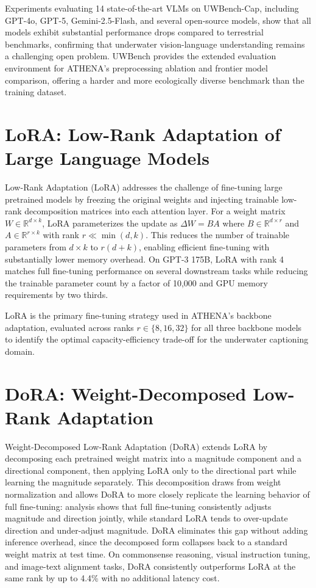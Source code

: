 Experiments evaluating 14 state-of-the-art VLMs on UWBench-Cap, including GPT-4o, GPT-5, Gemini-2.5-Flash, and several open-source models, show that all models exhibit substantial performance drops compared to terrestrial benchmarks, confirming that underwater vision-language understanding remains a challenging open problem. UWBench provides the extended evaluation environment for ATHENA's preprocessing ablation and frontier model comparison, offering a harder and more ecologically diverse benchmark than the training dataset.

\section[Hu, Shen, Wallis, Allen-Zhu, Li, Wang, Wang \& Chen]{LoRA: Low-Rank Adaptation of Large Language Models~\cite{lora}}
Low-Rank Adaptation (LoRA) addresses the challenge of fine-tuning large pretrained models by freezing the original weights and injecting trainable low-rank decomposition matrices into each attention layer. For a weight matrix $W \in \mathbb{R}^{d \times k}$, LoRA parameterizes the update as $\Delta W = BA$ where $B \in \mathbb{R}^{d \times r}$ and $A \in \mathbb{R}^{r \times k}$ with rank $r \ll \min(d, k)$. This reduces the number of trainable parameters from $d \times k$ to $r(d + k)$, enabling efficient fine-tuning with substantially lower memory overhead. On GPT-3 175B, LoRA with rank 4 matches full fine-tuning performance on several downstream tasks while reducing the trainable parameter count by a factor of 10,000 and GPU memory requirements by two thirds.

LoRA is the primary fine-tuning strategy used in ATHENA's backbone adaptation, evaluated across ranks $r \in \{8, 16, 32\}$ for all three backbone models to identify the optimal capacity-efficiency trade-off for the underwater captioning domain.

\section[Liu, Wang, Yin, Molchanov, Wang, Cheng \& Chen]{DoRA: Weight-Decomposed Low-Rank Adaptation~\cite{dora}}
Weight-Decomposed Low-Rank Adaptation (DoRA) extends LoRA by decomposing each pretrained weight matrix into a magnitude component and a directional component, then applying LoRA only to the directional part while learning the magnitude separately. This decomposition draws from weight normalization and allows DoRA to more closely replicate the learning behavior of full fine-tuning: analysis shows that full fine-tuning consistently adjusts magnitude and direction jointly, while standard LoRA tends to over-update direction and under-adjust magnitude. DoRA eliminates this gap without adding inference overhead, since the decomposed form collapses back to a standard weight matrix at test time. On commonsense reasoning, visual instruction tuning, and image-text alignment tasks, DoRA consistently outperforms LoRA at the same rank by up to 4.4\% with no additional latency cost.

